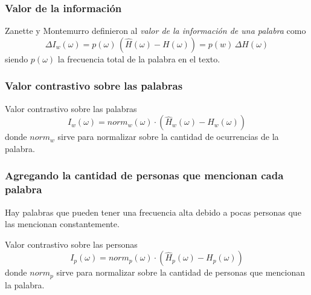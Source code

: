 \begin{frame}[t]\frametitle{Valor de la información}
    Zanette y Montemurro definieron al \textit{valor de la información de una palabra} como
 \begin{equation}
  \Delta I_w(\omega) = p(\omega) \,  (\widehat{H}(\omega) - H(\omega))  =  p(w) \, \Delta{H(\omega)}
 \end{equation}
siendo $p(\omega)$ la frecuencia total de la palabra en el texto.


\end{frame}

\begin{frame}[t]\frametitle{Valor contrastivo sobre las palabras}
    \begin{alertblock}{Valor contrastivo sobre las palabras}
        \begin{equation}
            I_w(\omega) = norm_{w}(\omega) \cdot (\widehat{H}_{w}(\omega) - H_{w}(\omega))
            \label{eq:iw}
        \end{equation}
        donde $norm_w$ sirve para normalizar sobre la cantidad de ocurrencias de la palabra.
    \end{alertblock}

\end{frame}

\begin{frame}[t]\frametitle{Agregando la cantidad de personas que mencionan cada palabra}
    Hay palabras que pueden tener una frecuencia alta debido a pocas personas que las mencionan constantemente.
    \begin{alertblock}{Valor contrastivo sobre las personas}
        \begin{equation}
            I_p(\omega) = norm_p(\omega) \cdot (\widehat{H}_p(\omega) - H_p(\omega))
            \label{eq:iu}
        \end{equation}
        donde $norm_p$ sirve para normalizar sobre la cantidad de personas que mencionan la palabra.
    \end{alertblock}

\end{frame}